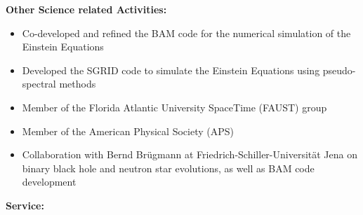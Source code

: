 \documentclass[11pt]{article}
\begin{document}
\bigskip

{\bf Other Science related Activities:}

\begin{itemize}
\item	Co-developed and refined the BAM code for the numerical 
	simulation of the Einstein Equations
\item	Developed the SGRID code to simulate the Einstein Equations using
	pseudo-spectral	methods
\item	Member of the Florida Atlantic University SpaceTime (FAUST) group
\item	Member of the American Physical Society (APS)
\item	Collaboration with Bernd Br\"ugmann at Friedrich-Schiller-Universit\"at 
	Jena on binary black hole and neutron star evolutions,
	as well as BAM code development
\end{itemize}


\bigskip

{\bf Service:}
\end{document}
